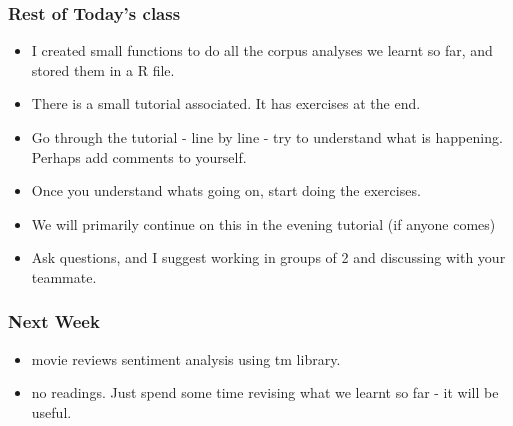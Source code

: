 \documentclass{beamer}
\begin{document}
\begin{frame}
\frametitle{Rest of Today's class}
\begin{itemize}
\item I created small functions to do all the corpus analyses we learnt so far, and stored them in a R file.
\item There is a small tutorial associated. It has exercises at the end.
\item Go through the tutorial - line by line - try to understand what is happening. Perhaps add comments to yourself. 
\item Once you understand whats going on, start doing the exercises.
\item We will primarily continue on this in the evening tutorial (if anyone comes)
\item Ask questions, and I suggest working in groups of 2 and discussing with your teammate.
\end{itemize} %
\end{frame}

\begin{frame}
\frametitle{Next Week}
\begin{itemize}
\item movie reviews sentiment analysis using tm library. 
\item no readings. Just spend some time revising what we learnt so far - it will be useful.
\end{itemize}
\end{frame}
\end{document}
